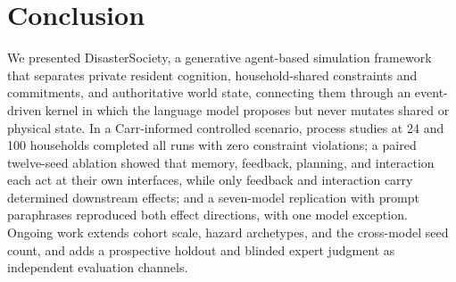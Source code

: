 \documentclass[journal]{IEEEtran}
\begin{document}
\section{Conclusion}
\label{sec:conclusion}

We presented DisasterSociety, a generative agent-based simulation framework
that separates private resident cognition, household-shared constraints and
commitments, and authoritative world state, connecting them through an
event-driven kernel in which the language model proposes but never mutates
shared or physical state. In a Carr-informed controlled scenario, process
studies at 24 and 100 households completed all runs with zero constraint
violations; a paired twelve-seed ablation showed that memory, feedback,
planning, and interaction each act at their own interfaces, while only
feedback and interaction carry determined downstream effects; and a
seven-model replication with prompt paraphrases reproduced both effect
directions, with one model exception. Ongoing work extends cohort scale,
hazard archetypes, and the cross-model seed count, and adds a prospective
holdout and blinded expert judgment as independent evaluation channels.


\FloatBarrier
{\small


}
\end{document}
